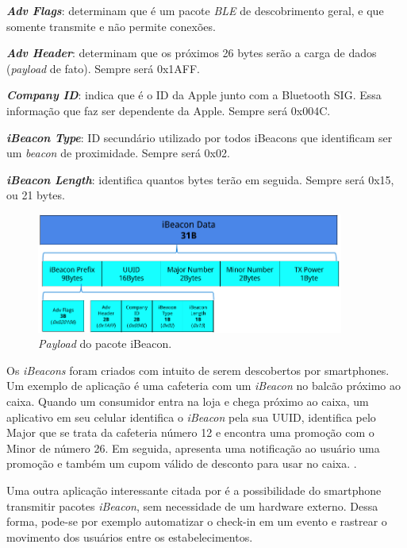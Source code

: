 \documentclass[
		12pt,				%
		openright,			%
		oneside,			%
		a4paper,			%
		chapter=TITLE,		%
		english,			%
		brazil				%
	]{abntex2}
\begin{document}
\begin{alineas}
	\item \textit{\textbf{Adv Flags}}: determinam que é um pacote \textit{BLE} de descobrimento geral, e que somente transmite e não permite conexões.
	\item \textit{\textbf{Adv Header}}: determinam que os próximos 26 bytes serão a carga de dados (\textit{payload} de fato). Sempre será 0x1AFF.
	\item \textit{\textbf{Company ID}}: indica que é o ID da Apple junto com a Bluetooth SIG. Essa informação que faz ser dependente da Apple. Sempre será 0x004C.
	\item\textit{\textbf{iBeacon Type}}: ID secundário utilizado por todos iBeacons que identificam ser um \textit{beacon} de proximidade. Sempre será 0x02.
	\item\textit{\textbf{iBeacon Length}}: identifica quantos bytes terão em seguida. Sempre será 0x15, ou 21 bytes.
\end{alineas}

\begin{figure}[htb]
	\caption{\label{fig:ibeacon-packet}\textit{Payload} do pacote iBeacon.}
	\begin{center}
		\includegraphics[width=0.9\textwidth]{img/ibeacon-packet.png}
	\end{center}
\end{figure}

Os \textit{iBeacons} foram criados com intuito de serem descobertos por smartphones. Um exemplo de aplicação é uma cafeteria com um \textit{iBeacon} no balcão próximo ao caixa. Quando um consumidor entra na loja e chega próximo ao caixa, um aplicativo em seu celular identifica o \textit{iBeacon} pela sua UUID, identifica pelo Major que se trata da cafeteria número 12 e encontra uma promoção com o Minor de número 26. Em seguida, apresenta uma notificação ao usuário uma promoção e também um cupom válido de desconto para usar no caixa. \cite{arm-beacons}.

Uma outra aplicação interessante citada por  é a possibilidade do smartphone transmitir pacotes \textit{iBeacon}, sem necessidade de um hardware externo. Dessa forma, pode-se por exemplo automatizar o check-in em um evento e rastrear o movimento dos usuários entre os estabelecimentos.
\end{document}
